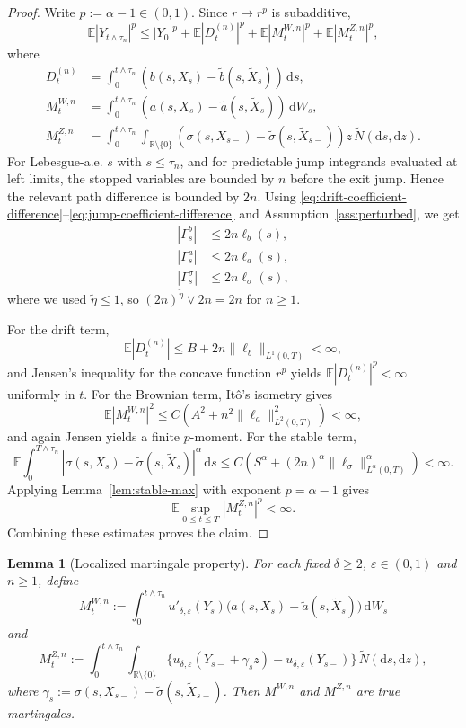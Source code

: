 \documentclass[10pt,a4paper]{amsart}
\newtheorem{lemma}[theorem]{Lemma}
\newcommand{\R}{\mathbb{R}}
\newcommand{\E}{\mathbb{E}}
\newcommand{\1}{\mathbf{1}}
\newcommand{\dd}{\,\mathrm{d}}
\newcommand{\md}{\mathrm{d}}
\newcommand{\wt}{\tilde}
\newcommand{\eps}{\varepsilon}
\begin{document}
\begin{proof}
Write $p:=\alpha-1\in(0,1)$. Since $r\mapsto r^p$ is subadditive,
\[
  \E|Y_{t\wedge\tau_n}|^p
  \le |Y_0|^p+\E|D_t^{(n)}|^p+\E|M_t^{W,n}|^p+\E|M_t^{Z,n}|^p,
\]
where
\begin{align*}
D_t^{(n)}&=\int_0^{t\wedge\tau_n}(b(s,X_s)-\wt b(s,\wt X_s))\dd s,\\
M_t^{W,n}&=\int_0^{t\wedge\tau_n}(a(s,X_s)-\wt a(s,\wt X_s))\dd W_s,\\
M_t^{Z,n}&=\int_0^{t\wedge\tau_n}\int_{\R\setminus\{0\}}(\sigma(s,X_{s-})-\wt\sigma(s,\wt X_{s-}))z\,\wt N(\md s,\md z).
\end{align*}
For Lebesgue-a.e. $s$ with $s\le\tau_n$, and for predictable jump integrands evaluated at left limits, the stopped variables are bounded by $n$ before the exit jump. Hence the relevant path difference is bounded by $2n$. Using \eqref{eq:drift-coefficient-difference}--\eqref{eq:jump-coefficient-difference} and Assumption~\ref{ass:perturbed}, we get
\begin{align*}
|\Gamma_s^b|&\le 2n \ell_b(s),\\
|\Gamma_s^a|&\le 2n \ell_a(s),\\
|\Gamma_s^\sigma|&\le 2n \ell_\sigma(s),
\end{align*}
where we used $\wt\eta\le1$, so $(2n)^{\wt\eta}\vee 2n=2n$ for $n\ge1$.

For the drift term,
\[
  \E|D_t^{(n)}|
  \le B+2n\|\ell_b\|_{L^1(0,T)}<\infty,
\]
and Jensen's inequality for the concave function $r^p$ yields $\E|D_t^{(n)}|^p<\infty$ uniformly in $t$. For the Brownian term, It\^o's isometry gives
\[
  \E|M_t^{W,n}|^2
  \le C\left(A^2+n^2\|\ell_a\|_{L^2(0,T)}^2\right)<\infty,
\]
and again Jensen yields a finite $p$-moment. For the stable term,
\[
  \E\int_0^{T\wedge\tau_n}|\sigma(s,X_s)-\wt\sigma(s,\wt X_s)|^\alpha\dd s
  \le C\left(S^\alpha+(2n)^\alpha\|\ell_\sigma\|_{L^\alpha(0,T)}^\alpha\right)<\infty.
\]
Applying Lemma~\ref{lem:stable-max} with exponent $p=\alpha-1$ gives
\[
  \E\sup_{0\le t\le T}|M_t^{Z,n}|^p<\infty.
\]
Combining these estimates proves the claim.
\end{proof}

\begin{lemma}[Localized martingale property]\label{lem:localized-martingales}
For each fixed $\delta\ge2$, $\eps\in(0,1)$ and $n\ge1$, define
\[
M_t^{W,n}:=\int_0^{t\wedge\tau_n}u'_{\delta,\eps}(Y_s)
\bigl(a(s,X_s)-\wt a(s,\wt X_s)\bigr)\dd W_s
\]
and
\[
M_t^{Z,n}:=\int_0^{t\wedge\tau_n}\int_{\R\setminus\{0\}}
\{u_{\delta,\eps}(Y_{s-}+\gamma_s z)-u_{\delta,\eps}(Y_{s-})\}\,\wt N(\md s,\md z),
\]
where $\gamma_s:=\sigma(s,X_{s-})-\wt\sigma(s,\wt X_{s-})$. Then $M^{W,n}$ and $M^{Z,n}$ are true martingales.
\end{lemma}
\end{document}
